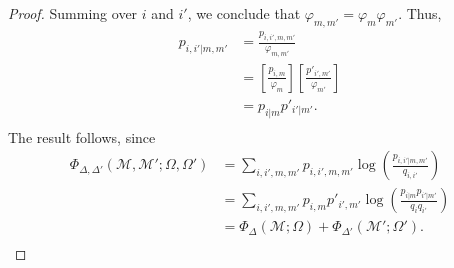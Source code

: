 \documentclass[10pt,a4paper]{amsart}
\begin{document}
\begin{proof}
Summing over $i$ and $i'$, we conclude that $\varphi_{m, m'} = \varphi_m \varphi_{m'}$.  Thus, 
\begin{align*}
p_{i, i' | m, m'} &= \frac{p_{i, i', m, m'}}{\varphi_{m, m'}} \\
                       &= \left[\frac{p_{i, m}}{\varphi_{m}}\right] \left[\frac{p'_{i', m'}}{\varphi_{m'}}\right] \\
                       &= p_{i|m} p'_{i'|m'}.  \\
\end{align*}
The result follows, since
\begin{align*}
\Phi_{\Delta, \Delta'} (\mathcal M, \mathcal M'; \Omega, \Omega') 
                       &= \sum_{i, i', m, m'} p_{i, i', m, m'} \log \left(\frac{p_{i,i'|m, m'}}{q_{i,i'}}\right)  \\
                       &= \sum_{i, i', m, m'}p_{i, m} p'_{i', m'} \log \left(\frac{p_{i|m} p_{i'|m'}}{q_{i}q_{i'}}\right)  \\
                       &= \Phi_{\Delta} ({\mathcal M}; \Omega)  + \Phi_{\Delta'} ({\mathcal M'}; \Omega').\\
\end{align*}
\end{proof}
\end{document}
